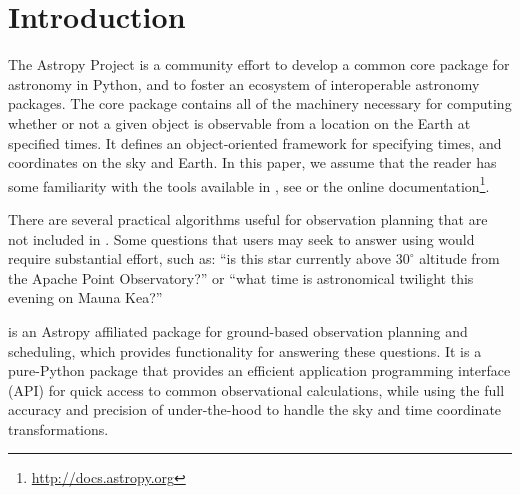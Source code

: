 %
%
%


\section{Introduction}

The Astropy Project is a community effort to develop a common core package for astronomy in Python, and to foster an ecosystem of interoperable astronomy packages. The \astropy core package contains all of the machinery necessary for computing whether or not a given object is observable from a location on the Earth at specified times. It defines an object-oriented framework for specifying times, and coordinates on the sky and Earth. In this paper, we assume that the reader has some familiarity with the tools available in \astropy, see \citet{Astropy2013} or the online documentation\footnote{\url{http://docs.astropy.org}}. 

There are several practical algorithms useful for observation planning that are not included in \astropy. Some questions that users may seek to answer using \astropy would require substantial effort, such as: ``is this star currently above $30^\circ$ altitude from the Apache Point Observatory?'' or ``what time is astronomical twilight this evening on Mauna Kea?''

\astroplan is an Astropy affiliated package for ground-based observation planning and scheduling, which provides functionality for answering these questions. It is a pure-Python package that provides an efficient application programming interface (API) for quick access to common observational calculations, while using the full accuracy and precision of \astropy under-the-hood to handle the sky and time coordinate transformations. 

